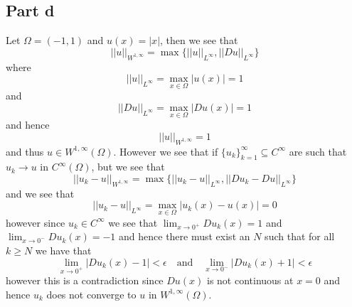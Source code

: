\documentclass[12pt]{report}
\newcommand{\norm}[1]{\left|\left|#1\right|\right|}
\begin{document}
\subsection*{Part d}
Let $\Omega = (-1,1)$ and $u(x) = |x|$, then we see that
\begin{equation*}
  \norm{u}_{W^{1,\infty}} = \max\{\norm{u}_{L^\infty}, \norm{Du}_{L^\infty}\} 
\end{equation*}
where
\begin{equation*}
  \norm{u}_{L^\infty} = \max_{x \in \Omega} |u(x)| = 1
\end{equation*}
and
\begin{equation*}
  \norm{Du}_{L^\infty} = \max_{x \in \Omega} |Du(x)| = 1
\end{equation*}
and hence
\begin{equation*}
  \norm{u}_{W^{1,\infty}} = 1
\end{equation*}
and thus $u \in W^{1,\infty}(\Omega)$. However we see that if $\{u_k\}_{k=1}^\infty \subseteq C^\infty$ are such that $u_k \to u$ in $C^\infty(\Omega)$, but we see that
\begin{equation*}
  \norm{u_k - u}_{W^{1,\infty}} = \max\{\norm{u_k - u}_{L^\infty}, \norm{Du_k - Du}_{L^\infty}\} 
\end{equation*}
and we see that
\begin{equation*}
  \norm{u_k - u}_{L^\infty} = \max_{x \in \Omega} |u_k(x) - u(x)| = 0
\end{equation*}
however since $u_k \in C^\infty$ we see that $\lim_{x \to 0^+} Du_k(x) = 1$ and $\lim_{x \to 0^-} Du_k(x) = -1$ and hence there must exist an $N$ such that for all $k \geq N$ we have that 
\begin{equation*}
  \lim_{x \to 0^+} |Du_k(x) - 1| < \epsilon \quad \text{and} \quad \lim_{x \to 0^-} |Du_k(x) + 1| < \epsilon
\end{equation*}
however this is a contradiction since $Du(x)$ is not continuous at $x = 0$ and hence $u_k$ does not converge to $u$ in $W^{1,\infty}(\Omega)$.
\end{document}
